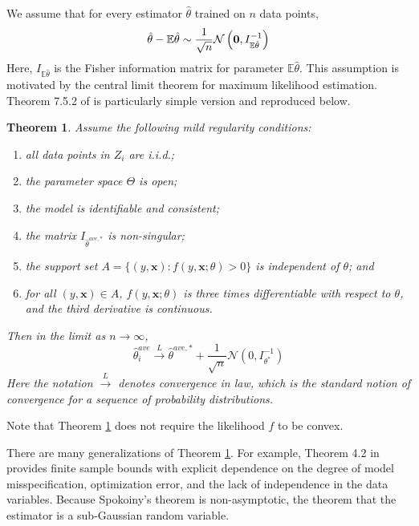 \documentclass[twoside]{article}
\newtheorem{theorem}{Theorem}
\newcommand{\zero}{\text{\textbf{0}}}
\newcommand{\E}{\mathbb{E}}
\newcommand{\x}{\mathbf{x}}
\newcommand{\w}{\theta}
\newcommand{\wave}{\hat\w^{ave}}
\newcommand{\wtave}{\hat\w^{ave,*}}
\newcommand{\wmle}{\hat\w^{mle}}
\newcommand{\wstar}{{\w^{*}}}
\newcommand{\I}{I}
\newcommand{\Iinv}{I^{-1}}
\newcommand{\law}{\ensuremath{\xrightarrow{L}}}
\newcommand{\normal}[2]{\ensuremath{\mathcal{N}\left({{#1}},{{#2}}\right)}}
\begin{document}
We assume that for every estimator $\hat\w$ trained on $n$ data points,
\begin{equation}
\label{eq:assumption}
\hat\w - \E\hat\w \sim \frac{1}{\sqrt n}\normal{\zero}{I^{-1}_{\E\hat\w}}
\end{equation}
%
Here, $I_{\E\hat\w}$ is the Fisher information matrix for parameter $\E\hat\w$.
This assumption is motivated by the central limit theorem for maximum likelihood estimation.
Theorem 7.5.2 of \cite{lehmann1999elements} is particularly simple version and reproduced below.
\begin{theorem}
\label{thm:clt}
Assume the following mild regularity conditions:
\begin{enumerate}[noitemsep,topsep=0pt]%
\item all data points in $Z_i$ are i.i.d.;
\item the parameter space $\Theta$ is open;
\item the model is identifiable and consistent;
\item the matrix $\I_{\wtave}$ is non-singular;
\item the support set $A = \{(y,\x) : f(y,\x;\theta) > 0\}$ is independent of $\theta$;
and \item for all $(y,\x)\in A$, $f(y,\x;\theta)$ is three times differentiable with respect to $\theta$,
and the third derivative is continuous.
\end{enumerate}
Then in the limit as $n\to\infty$,
\begin{equation*}
\wave_i \law \wtave + \frac{1}{\sqrt n} \normal{0}{\Iinv_\wstar}
\end{equation*}
Here the notation $\law$ denotes convergence in law,
which is the standard notion of convergence for a sequence of probability distributions.
\end{theorem}

Note that Theorem \ref{thm:clt} does not require the likelihood $f$ to be convex.


There are many generalizations of Theorem \ref{thm:clt}.
For example, Theorem 4.2 in \cite{spokoiny2012parametric} provides finite sample bounds with explicit dependence on the degree of model misspecification, optimization error, and the lack of independence in the data variables.
Because Spokoiny's theorem is non-asymptotic, the theorem that the estimator is a sub-Gaussian random variable.
\end{document}
